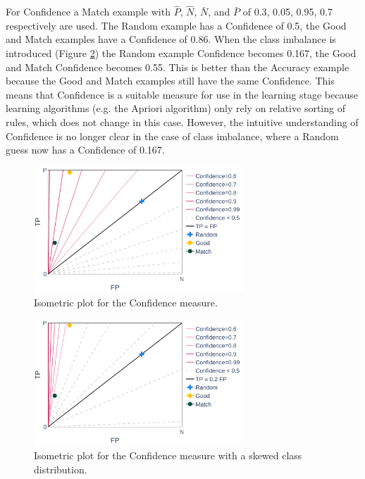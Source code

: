 For Confidence a Match example with $\hat P$, $\hat N$, $\bar N$, and $\bar P$ of 0.3, 0.05, 0.95, 0.7 respectively are used. The Random example has a Confidence of 0.5, the Good and Match examples have a Confidence of 0.86. When the class imbalance is introduced (Figure \ref{fig:conf-bias}) the Random example Confidence becomes 0.167, the Good and Match Confidence becomes 0.55. This is better than the Accuracy example because the Good and Match examples still have the same Confidence. This means that Confidence is a suitable measure for use in the learning stage because learning algorithms (e.g. the Apriori algorithm) only rely on relative sorting of rules, which does not change in this case. However, the intuitive understanding of Confidence is no longer clear in the case of class imbalance, where a Random guess now has a Confidence of 0.167.


\begin{figure}[ht]
    \centering
    \includegraphics[width=0.7\textwidth]{Figures/MP-Confidence}
		\caption{Isometric plot for the Confidence measure.}
    \label{fig:conf}
\end{figure}
\begin{figure}[ht]
    \centering
    \includegraphics[width=0.7\textwidth]{Figures/MP-Confidence-bias}
		\caption{Isometric plot for the Confidence measure with a skewed class distribution.}
    \label{fig:conf-bias}
\end{figure}

